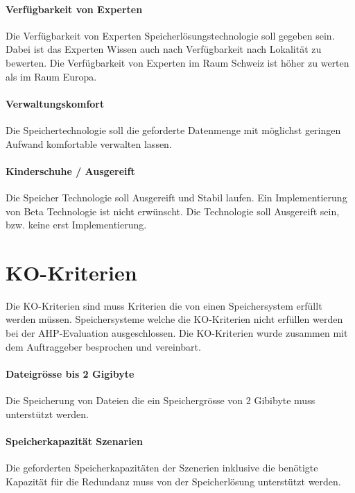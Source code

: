 \paragraph{Verfügbarkeit von Experten}\label{Soll-6-3}
Die Verfügbarkeit von Experten Speicherlösungstechnologie soll gegeben sein. Dabei ist das Experten Wissen auch nach Verfügbarkeit nach Lokalität zu bewerten. Die Verfügbarkeit von Experten im Raum Schweiz ist höher zu werten als im Raum Europa.

\paragraph{Verwaltungskomfort}\label{Soll-6-4}
Die Speichertechnologie soll die geforderte Datenmenge mit möglichst geringen Aufwand komfortable verwalten lassen.

\paragraph{Kinderschuhe / Ausgereift}\label{Soll-6-5}
Die Speicher Technologie soll Ausgereift und Stabil laufen. Ein Implementierung von Beta Technologie ist nicht erwünscht.
Die Technologie soll Ausgereift sein, bzw. keine erst Implementierung.

\section{KO-Kriterien}
Die KO-Kriterien sind muss Kriterien die von einen Speichersystem erfüllt werden müssen. Speichersysteme welche die KO-Kriterien nicht erfüllen werden bei der AHP-Evaluation ausgeschlossen. Die KO-Kriterien wurde zusammen mit dem Auftraggeber besprochen und vereinbart.

\setcounter{paragraph}{0}
\renewcommand\theparagraph{KO-\arabic{paragraph}}

\paragraph{Dateigrösse bis 2 Gigibyte}\label{KO-1}
Die Speicherung von Dateien die ein Speichergrösse von 2 Gibibyte muss unterstützt werden.

\paragraph{Speicherkapazität Szenarien}\label{KO-2}
Die geforderten Speicherkapazitäten der Szenerien inklusive die benötigte Kapazität für die Redundanz muss von der Speicherlösung unterstützt werden.

